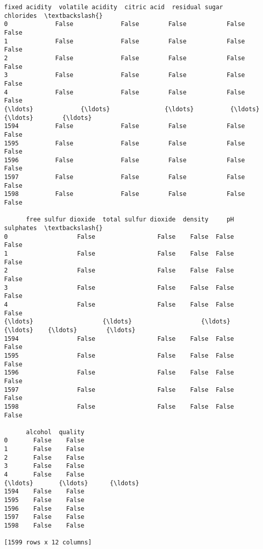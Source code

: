 \documentclass[11pt]{article}
\makeatletter
\newcommand{\boxspacing}{\kern\kvtcb@left@rule\kern\kvtcb@boxsep}
\newcommand{\prompt}[4]{
        \ttfamily\llap{{\color{#2}[#3]:\hspace{3pt}#4}}\vspace{-\baselineskip}
    }
\makeatother
\begin{document}
            \begin{tcolorbox}[breakable, size=fbox, boxrule=.5pt, pad at break*=1mm, opacityfill=0]
\prompt{Out}{outcolor}{8}{\boxspacing}
\begin{Verbatim}[commandchars=\\\{\}]
      fixed acidity  volatile acidity  citric acid  residual sugar  chlorides  \textbackslash{}
0             False             False        False           False      False
1             False             False        False           False      False
2             False             False        False           False      False
3             False             False        False           False      False
4             False             False        False           False      False
{\ldots}             {\ldots}               {\ldots}          {\ldots}             {\ldots}        {\ldots}
1594          False             False        False           False      False
1595          False             False        False           False      False
1596          False             False        False           False      False
1597          False             False        False           False      False
1598          False             False        False           False      False

      free sulfur dioxide  total sulfur dioxide  density     pH  sulphates  \textbackslash{}
0                   False                 False    False  False      False
1                   False                 False    False  False      False
2                   False                 False    False  False      False
3                   False                 False    False  False      False
4                   False                 False    False  False      False
{\ldots}                   {\ldots}                   {\ldots}      {\ldots}    {\ldots}        {\ldots}
1594                False                 False    False  False      False
1595                False                 False    False  False      False
1596                False                 False    False  False      False
1597                False                 False    False  False      False
1598                False                 False    False  False      False

      alcohol  quality
0       False    False
1       False    False
2       False    False
3       False    False
4       False    False
{\ldots}       {\ldots}      {\ldots}
1594    False    False
1595    False    False
1596    False    False
1597    False    False
1598    False    False

[1599 rows x 12 columns]
\end{Verbatim}
\end{tcolorbox}
        
\end{document}
